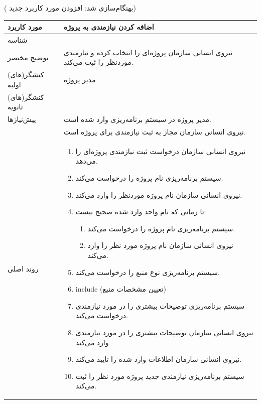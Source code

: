 \newpage
({\color{red} بهنگام‌سازی شد: افزودن مورد کاربرد جدید})
\begin{table}[H]
	\centering
	\begin{tabular}{|p{3cm}|p{10cm}|}
		\hline
		
		
		مورد کاربرد	& اضافه کردن نیازمندی به پروژه  \\
		\hline
		
		شناسه & 
		\stepcounter{usecase_ID}
		
		\arabic{usecase_ID} \\
		
		\hline
		
		توضیح مختصر & نیروی انسانی سازمان پروژه‌ای را انتخاب کرده و نیازمندی موردنظر را ثبت می‌کند. \\
		\hline
		
		کنشگر(های) اولیه& مدیر پروژه \\
		\hline
		
		کنشگر(های) ثانویه&  \\
		\hline
		
		پیش‌نیازها
		& مدیر پروژه در سیستم برنامه‌ریزی وارد شده است.\\
		& نیروی انسانی سازمان مجاز به ثبت نیازمندی برای پروژه است.	\\
		\hline
		
		
		روند اصلی &
		\begin{enumerate}[topsep=0cm,leftmargin=0.5cm]
			\item نیروی انسانی سازمان درخواست ثبت نیازمندی پروژه‌ای را می‌دهد.
			\item سیستم برنامه‌ریزی نام پروژه را درخواست می‌کند.
			\item نیروی انسانی سازمان نام پروژه موردنظر را وارد می‌کند.
			\item تا زمانی که نام واحد وارد شده صحیح نیست: 
			\begin{enumerate}[topsep=0cm,leftmargin=0.5cm]
				\item سیستم برنامه‌ریزی نام پروژه را درخواست می‌کند. 
				\item نیروی انسانی سازمان نام پروژه مورد نظر را وارد می‌کند. 
			\end{enumerate}
			\item سیستم برنامه‌ریزی نوع منبع را درخواست می‌کند.
			\item include (تعیین مشخصات منبع)
			\item سیستم برنامه‌ریزی توضیحات بیشتری را در مورد نیازمندی درخواست می‌کند.
			\item نیروی انسانی سازمان توضیحات بیشتری را در مورد نیازمندی وارد می‌کند
			\item نیروی انسانی سازمان اطلاعات وارد شده را تایید می‌کند.
			\item سیستم برنامه‌ریزی نیازمندی جدید پروژه مورد نظر را ثبت می‌کند.
		\end{enumerate} \\
		

\end{tabular}
\end{table}
